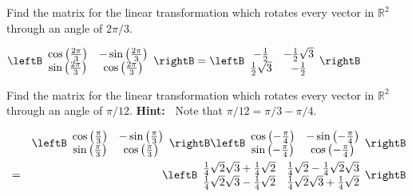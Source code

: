 \begin{enumialphparenastyle}
\begin{ex} Find the matrix for the linear transformation which rotates every
vector in $\mathbb{R}^{2}$ through an angle of $2\pi /3.$
\begin{sol}
$\leftB
\begin{array}{cc}
\cos \left( \frac{2\pi }{3}\right) & -\sin \left( \frac{2\pi }{3}\right) \\
\sin \left( \frac{2\pi }{3}\right) & \cos \left( \frac{2\pi }{3}\right)
\end{array}
\rightB = \leftB
\begin{array}{cc}
-\frac{1}{2} & -\frac{1}{2}\sqrt{3} \\
\frac{1}{2}\sqrt{3} & -\frac{1}{2}
\end{array}
\rightB $
\end{sol}
\end{ex}

\begin{ex} Find the matrix for the linear transformation which rotates every
vector in $\mathbb{R}^{2}$ through an angle of $\pi /12.$ \textbf{Hint:\ }
Note that $\pi /12=\pi /3-\pi /4.$
\begin{sol}
\begin{eqnarray*}
&&\leftB
\begin{array}{cc}
\cos \left( \frac{\pi }{3}\right)  & -\sin \left( \frac{\pi }{3}\right)  \\
\sin \left( \frac{\pi }{3}\right)  & \cos \left( \frac{\pi }{3}\right)
\end{array}
\rightB \leftB
\begin{array}{cc}
\cos \left( -\frac{\pi }{4}\right)  & -\sin \left( -\frac{\pi }{4}\right)
\\
\sin \left( -\frac{\pi }{4}\right)  & \cos \left( -\frac{\pi }{4}\right)
\end{array}
\rightB  \\
&=&\leftB
\begin{array}{cc}
\frac{1}{4}\sqrt{2}\sqrt{3}+\frac{1}{4}\sqrt{2} & \frac{1}{4}\sqrt{2}-\frac{1
}{4}\sqrt{2}\sqrt{3} \\
\frac{1}{4}\sqrt{2}\sqrt{3}-\frac{1}{4}\sqrt{2} & \frac{1}{4}\sqrt{2}\sqrt{3}
+\frac{1}{4}\sqrt{2}
\end{array}
\rightB
\end{eqnarray*}
\end{sol}
\end{ex}


\end{enumialphparenastyle}
